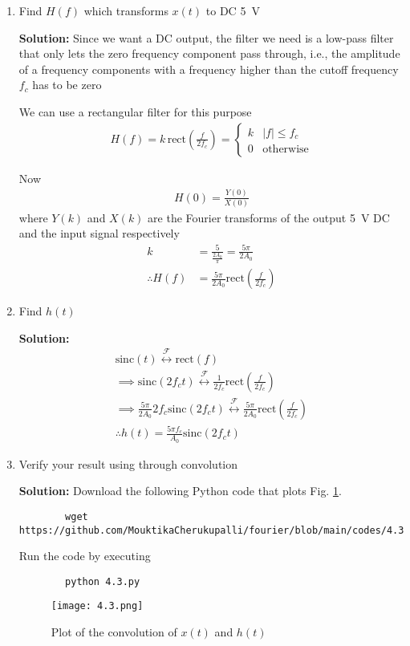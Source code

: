 \documentclass[journal,12pt,twocolumn]{IEEEtran}
\newcommand{\solution}{\noindent \textbf{Solution: }}
\providecommand{\abs}[1]{\left\vert#1\right\vert}
\providecommand{\system}[1]{\overset{\mathcal{#1}}{ \longleftrightarrow}}
\providecommand{\rect}[1]{\mathrm{rect}\ensuremath{\left(#1\right)}}
\providecommand{\sinc}[1]{\mathrm{sinc}\ensuremath{\left(#1\right)}}
\numberwithin{equation}{section}
\numberwithin{figure}{section}
\renewcommand\thesection{\arabic{section}}
\begin{document}
	\begin{enumerate}[label=\thesection.\arabic*,ref=\thesection.\theenumi]
	\item Find $H(f)$ which transforms $x(t)$ to DC \SI{5}{\volt}
	
	\solution Since we want a DC output, the filter we need is a low-pass filter that only lets the zero frequency component pass through, i.e., the amplitude of a  frequency components with a frequency higher than the cutoff frequency $f_c$ has to be zero
	
	We can use a rectangular filter for this purpose
	\begin{align}
		H(f) = k\,\rect{\frac{f}{2f_c}} =
		\begin{cases}
			k & \abs{f} \le f_c \\
			0 & \text{otherwise}
		\end{cases}
	\end{align}
	
	Now
	\begin{align}
		H(0) = \frac{Y(0)}{X(0)}
	\end{align}
	where $Y(k)$ and $X(k)$ are the Fourier transforms of the output \SI{5}{\volt} DC and the input signal respectively
	\begin{align}
		k &= \frac{5}{\frac{2A_0}{\pi}} = \frac{5\pi}{2A_0} \\
		\therefore H(f) &= \frac{5\pi}{2A_0}\rect{\frac{f}{2f_c}}
	\end{align}
	
	
	\item Find $h(t)$
	
	\solution 
	\begin{gather}
		\sinc{t} \system{F} \rect{f} \\
		\implies \sinc{2f_ct} \system{F} \frac{1}{2f_c}\rect{\frac{f}{2f_c}} \\
		\implies \frac{5\pi}{2A_0} 2f_c \sinc{2f_ct} \system{F} \frac{5\pi}{2A_0}\rect{\frac{f}{2f_c}} \\
		\therefore h(t) = \frac{5\pi f_c}{A_0} \sinc{2f_ct}
	\end{gather}
	
	\item Verify your result using  through convolution
	
	\solution Download the following Python code that plots Fig. \ref{fig-4.3}.
	\begin{lstlisting}
		wget https://github.com/MouktikaCherukupalli/fourier/blob/main/codes/4.3.py
	\end{lstlisting}
	
	Run the code by executing
	\begin{lstlisting}
		python 4.3.py
	\end{lstlisting}

	\begin{figure}[!ht]
		\centering
		\texttt{[image: 4.3.png]}
		\caption{Plot of the convolution of $x(t)$ and $h(t)$}
		\label{fig-4.3}	
	\end{figure}
	\end{enumerate}
	
\end{document}
